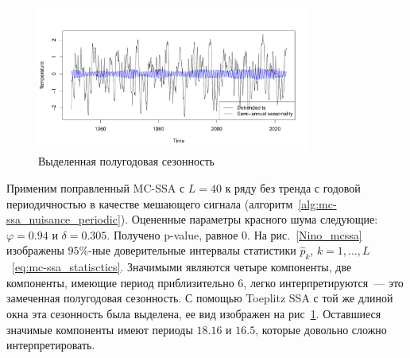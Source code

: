 \documentclass[specialist,
substylefile = spbu_report.rtx,
subf,href,colorlinks=true, 12pt]{disser}
\theoremstyle{definition}
\begin{document}
\begin{figure}
	\centering
	\includegraphics[width=0.8\textwidth]{img/Nino_reconstruct_semi_annual.pdf}
	\caption{Выделенная полугодовая сезонность}
	\label{Nino_reconstruct_semi_annual}
\end{figure}

Применим поправленный MC-SSA с $L=40$ к ряду без тренда с годовой периодичностью в качестве мешающего сигнала (алгоритм~\ref{alg:mc-ssa_nuisance_periodic}). Оцененные параметры красного шума следующие: $\varphi=0.94$ и $\delta=0.305$. Получено p-value, равное $0$. На рис.~\ref{Nino_mcssa} изображены $95\%$-ные доверительные интервалы статистики $\hat p_k$, $k=1,\ldots,L$~\eqref{eq:mc-ssa_statisctics}. Значимыми являются четыре компоненты, две компоненты, имеющие период приблизительно $6$, легко интерпретируются~---  это замеченная полугодовая сезонность. С помощью Toeplitz SSA с той же длиной окна эта сезонность была выделена, ее вид изображен на рис~\ref{Nino_reconstruct_semi_annual}. Оставшиеся значимые компоненты имеют периоды $18.16$ и $16.5$, которые довольно сложно интерпретировать.
\end{document}
